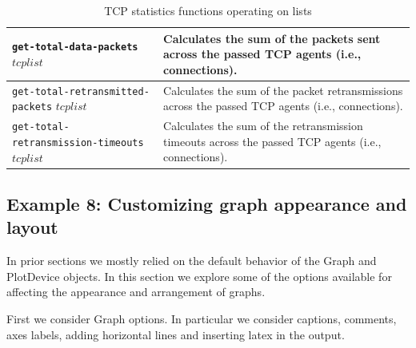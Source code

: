 \documentclass[11pt]{article}
\begin{document}
\begin{table}[ht]
\begin{center}
\begin{tabular}{|l|l|}
\verb|get-total-data-packets| $tcplist$ &
  \begin{minipage}[c]{3in}
  \vspace{0.05in}
  Calculates the sum of the packets sent across the passed TCP agents
  (i.e., connections).
  \vspace{0.05in}
  \end{minipage} \\ \hline

\verb|get-total-retransmitted-packets| $tcplist$ &
  \begin{minipage}[c]{3in}
  \vspace{0.05in}
  Calculates the sum of the packet retransmissions across the passed
  TCP agents (i.e., connections).
  \vspace{0.05in}
  \end{minipage} \\ \hline

\verb|get-total-retransmission-timeouts| $tcplist$ &
  \begin{minipage}[c]{3in}
  \vspace{0.05in}
  Calculates the sum of the retransmission timeouts across the passed
  TCP agents (i.e., connections).
  \vspace{0.05in}
  \end{minipage} \\ \hline

\end{tabular}
\end{center}
\caption{TCP statistics functions operating on lists}\label{ListTCPStatsTable}
\end{table}

\clearpage
\subsection{Example 8: Customizing graph appearance and layout}\label{Ex8Section}

In prior sections we mostly relied on the default behavior of the
Graph and PlotDevice objects.  In this section we explore some of the
options available for affecting the appearance and arrangement of graphs.

First we consider Graph options.  In particular we consider captions,
comments, axes labels, adding horizontal lines and inserting latex in 
the output.
\end{document}
